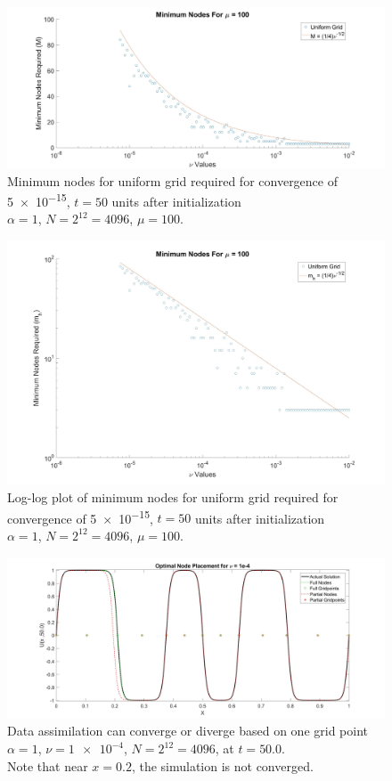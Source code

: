 \documentclass[12pt]{amsart}
\theoremstyle{plain}
\theoremstyle{definition}
\theoremstyle{remark}
\numberwithin{equation}{section} %
\numberwithin{figure}{section}   %
\begin{document}
\begin{figure}
	\centering
\includegraphics[scale=0.15]{MinimumNodes_Grid.jpg}
\caption{Minimum nodes for uniform grid required for convergence of \num{5e-15}, $t=50$ units after initialization \\$\alpha = 1$, $N  =2^{12}=4096$, $\mu = 100$. }
\label{fig:minimumGrid}
\end{figure}
\begin{figure}
	\centering
	\includegraphics[scale=0.15]{MinimumLog.jpg}
	\caption{Log-log plot of minimum nodes for uniform grid required for convergence of \num{5e-15}, $t=50$ units after initialization \\$\alpha = 1$, $N  =2^{12}=4096$, $\mu = 100$. }
	\label{fig:minLog}
\end{figure}
\begin{figure}
	\centering
	\includegraphics[scale=0.15]{Optimal.jpg}
	\caption{Data assimilation can converge or diverge based on one grid point $\alpha = 1$, $\nu=\num{1e-4}$, $N = 2^{12}=4096$, at $t=50.0$.\\
	Note that near $x = 0.2$, the simulation is not converged.}
	\label{fig:optimal}
\end{figure}
\end{document}
